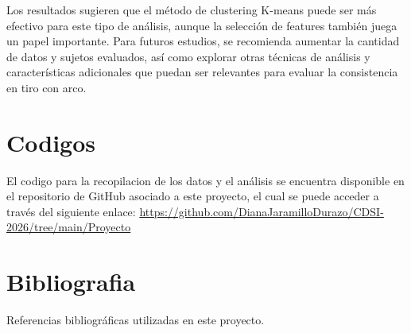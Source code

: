 \documentclass[11pt,a4paper,twocolumn,twoside]{rho-class/rho}
\begin{document}
    Los resultados sugieren que el método de clustering K-means puede ser más efectivo para este tipo de análisis, aunque la selección de features también juega un papel importante. Para futuros estudios, se recomienda aumentar la cantidad de datos y sujetos evaluados, así como explorar otras técnicas de análisis y características adicionales que puedan ser relevantes para evaluar la consistencia en tiro con arco.


\section{Codigos}

	El codigo para la recopilacion de los datos y el análisis se encuentra disponible en el repositorio de GitHub asociado a este proyecto, el cual se puede acceder a través del siguiente enlace: \url{https://github.com/DianaJaramilloDurazo/CDSI-2026/tree/main/Proyecto}

\section{Bibliografia}
		
	Referencias bibliográficas utilizadas en este proyecto.



\printbibliography

\end{document}
